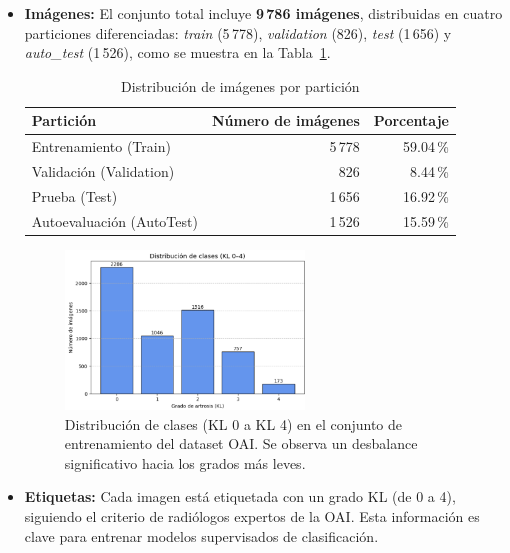 \documentclass[11pt,spanish,listoffigures,listoftables]{tfgetsinf}
\begin{document}
\begin{itemize}
    \item \textbf{Imágenes:} El conjunto total incluye \textbf{9\,786 imágenes}, distribuidas en cuatro particiones diferenciadas: \textit{train} (5\,778), \textit{validation} (826), \textit{test} (1\,656) y \textit{auto\_test} (1\,526), como se muestra en la Tabla~\ref{tab:splits}.
    
    \begin{table}[h]
        \centering
        \caption{Distribución de imágenes por partición}
        \label{tab:splits}
        \begin{tabular}{lrr}
            \toprule
            \textbf{Partición} & \textbf{Número de imágenes} & \textbf{Porcentaje} \\
            \midrule
            Entrenamiento (Train) & 5\,778 & 59.04\,\% \\
            Validación (Validation) & 826 & 8.44\,\% \\
            Prueba (Test) & 1\,656 & 16.92\,\% \\
            Autoevaluación (AutoTest) & 1\,526 & 15.59\,\% \\
            \bottomrule
        \end{tabular}
    \end{table}

    \begin{figure}[ht]
        \centering
        \includegraphics[width=0.6\textwidth]{class_distribution_train.png}
        \caption{Distribución de clases (KL 0 a KL 4) en el conjunto de entrenamiento del dataset OAI. Se observa un desbalance significativo hacia los grados más leves.}
        \label{fig:class_barplot}
    \end{figure}

    \item \textbf{Etiquetas:} Cada imagen está etiquetada con un grado KL (de 0 a 4), siguiendo el criterio de radiólogos expertos de la OAI. Esta información es clave 
    para entrenar modelos supervisados de clasificación.


\end{itemize}
\end{document}
